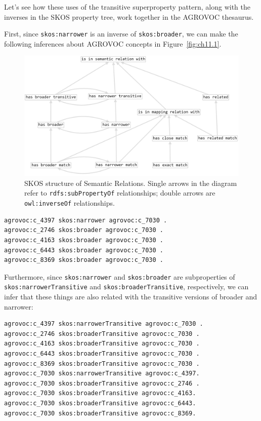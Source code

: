 Let's see how these uses of the transitive superproperty pattern, along
with the inverses in the
SKOS property tree, work together in the AGROVOC thesaurus.

First, since \texttt{skos:narrower} is an inverse of \texttt{skos:broader}, we can make
the following inferences about AGROVOC concepts in Figure~\ref{fig:ch11.1}.

\begin{figure}
\centering
\includegraphics[width=5in]{SWWOv3/media/ch11/figure11-2i.png}
\caption{SKOS structure of Semantic Relations. Single arrows in the diagram refer to \texttt{rdfs:subPropertyOf} relationships;
double arrows are \texttt{owl:inverseOf} relationships.}
\label{fig:ch11.2}
\end{figure}





\begin{lstlisting}
agrovoc:c_4397 skos:narrower agrovoc:c_7030 .
agrovoc:c_2746 skos:broader agrovoc:c_7030 .
agrovoc:c_4163 skos:broader agrovoc:c_7030 .
agrovoc:c_6443 skos:broader agrovoc:c_7030 .
agrovoc:c_8369 skos:broader agrovoc:c_7030 .
\end{lstlisting}

Furthermore, since \texttt{skos:narrower} and \texttt{skos:broader} are subproperties of
\texttt{skos:narrowerTransitive} and \texttt{skos:broaderTransitive}, respectively, we
can infer that these things are also related with the transitive
versions of broader and narrower:

\begin{lstlisting}
agrovoc:c_4397 skos:narrowerTransitive agrovoc:c_7030 .
agrovoc:c_2746 skos:broaderTransitive agrovoc:c_7030 .
agrovoc:c_4163 skos:broaderTransitive agrovoc:c_7030 .
agrovoc:c_6443 skos:broaderTransitive agrovoc:c_7030 .
agrovoc:c_8369 skos:broaderTransitive agrovoc:c_7030 .
agrovoc:c_7030 skos:narrowerTransitive agrovoc:c_4397.
agrovoc:c_7030 skos:broaderTransitive agrovoc:c_2746 .
agrovoc:c_7030 skos:broaderTransitive agrovoc:c_4163.
agrovoc:c_7030 skos:broaderTransitive agrovoc:c_6443.
agrovoc:c_7030 skos:broaderTransitive agrovoc:c_8369.
\end{lstlisting}

